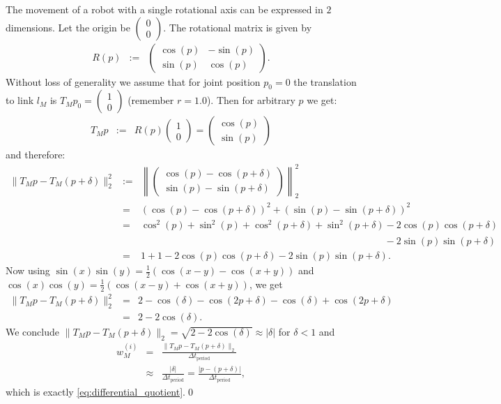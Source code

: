 \documentclass{article}
\begin{document}
The movement of a robot with a single rotational axis can be expressed in $2$ dimensions. Let the origin be $\left(\begin{array}{c}0\\0\end{array}\right)$. The rotational matrix is given by
\begin{eqnarray}
R(p) &:=& \left(\begin{array}{rr}\cos(p)&-\sin(p)\\ \sin(p)&\cos(p)\end{array}\right).
\end{eqnarray}
Without loss of generality we assume that for joint position $p_0=0$ the translation to link $l_M$ is $T_Mp_0=\left(\begin{array}{c}1\\0\end{array}\right)$ (remember $r=1.0$). Then for arbitrary $p$ we get:
\begin{eqnarray}
T_Mp &:=& R(p)\left(\begin{array}{c}1\\0\end{array}\right) = \left(\begin{array}{c}\cos(p)\\ \sin(p)\end{array}\right)
\end{eqnarray}
and therefore:
\begin{eqnarray}
  \|T_Mp-T_M(p+\delta)\|_2^2 &:=& \left\|\left(\begin{array}{r}\cos(p)-\cos(p+\delta)\\ \sin(p)-\sin(p+\delta)\end{array}\right)\right\|_2^2\\
  &=& (\cos(p)-\cos(p+\delta))^2+(\sin(p)-\sin(p+\delta))^2\\
  &=& \cos^2(p)+\sin^2(p)+\cos^2(p+\delta)+\sin^2(p+\delta)-2\cos(p)\cos(p+\delta)\\
  && \phantom{\cos^2(p)+\sin^2(p)+\cos^2(p+\delta)+\sin^2(p+\delta)}-2\sin(p)\sin(p+\delta)\\
  &=& 1+1-2\cos(p)\cos(p+\delta)-2\sin(p)\sin(p+\delta).
\end{eqnarray}
Now using $\sin(x)\sin(y)=\frac{1}{2}(\cos(x-y)-\cos(x+y))$ and $\cos(x)\cos(y)=\frac{1}{2}(\cos(x-y)+\cos(x+y))$, we get
\begin{eqnarray}
\|T_Mp-T_M(p+\delta)\|_2^2  &=& 2-\cos(\delta)-\cos(2p+\delta)-\cos(\delta)+\cos(2p+\delta)\\
  &=& 2-2\cos(\delta).
\end{eqnarray}
We conclude $\|T_Mp-T_M(p+\delta)\|_2=\sqrt{2-2\cos(\delta)}\approx|\delta|$ for $\delta<1$ and
\begin{eqnarray}
  w_M^{(i)} &=& \frac{\|T_Mp-T_M(p+\delta)\|_2}{\Delta t_{\mathrm{period}}}\\
  &\approx& \frac{|\delta|}{\Delta t_{\mathrm{period}}} = \frac{|p-(p+\delta)|}{\Delta t_{\mathrm{period}}},
\end{eqnarray}
which is exactly \eqref{eq:differential_quotient}.\qed
\end{document}
